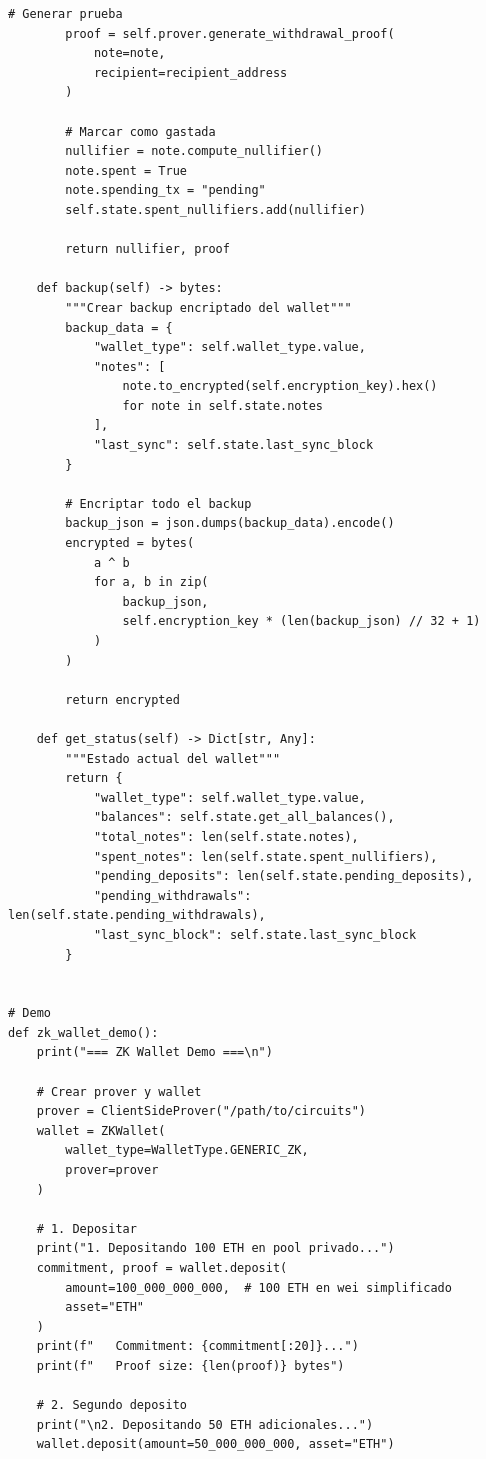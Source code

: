 \documentclass[11pt,a4paper,twoside]{book}
\theoremstyle{definition}
\theoremstyle{remark}
\begin{document}
\begin{lstlisting}[style=python, caption={Arquitectura de wallet con soporte ZK}]
        # Generar prueba
        proof = self.prover.generate_withdrawal_proof(
            note=note,
            recipient=recipient_address
        )
        
        # Marcar como gastada
        nullifier = note.compute_nullifier()
        note.spent = True
        note.spending_tx = "pending"
        self.state.spent_nullifiers.add(nullifier)
        
        return nullifier, proof
    
    def backup(self) -> bytes:
        """Crear backup encriptado del wallet"""
        backup_data = {
            "wallet_type": self.wallet_type.value,
            "notes": [
                note.to_encrypted(self.encryption_key).hex()
                for note in self.state.notes
            ],
            "last_sync": self.state.last_sync_block
        }
        
        # Encriptar todo el backup
        backup_json = json.dumps(backup_data).encode()
        encrypted = bytes(
            a ^ b 
            for a, b in zip(
                backup_json, 
                self.encryption_key * (len(backup_json) // 32 + 1)
            )
        )
        
        return encrypted
    
    def get_status(self) -> Dict[str, Any]:
        """Estado actual del wallet"""
        return {
            "wallet_type": self.wallet_type.value,
            "balances": self.state.get_all_balances(),
            "total_notes": len(self.state.notes),
            "spent_notes": len(self.state.spent_nullifiers),
            "pending_deposits": len(self.state.pending_deposits),
            "pending_withdrawals": len(self.state.pending_withdrawals),
            "last_sync_block": self.state.last_sync_block
        }


# Demo
def zk_wallet_demo():
    print("=== ZK Wallet Demo ===\n")
    
    # Crear prover y wallet
    prover = ClientSideProver("/path/to/circuits")
    wallet = ZKWallet(
        wallet_type=WalletType.GENERIC_ZK,
        prover=prover
    )
    
    # 1. Depositar
    print("1. Depositando 100 ETH en pool privado...")
    commitment, proof = wallet.deposit(
        amount=100_000_000_000,  # 100 ETH en wei simplificado
        asset="ETH"
    )
    print(f"   Commitment: {commitment[:20]}...")
    print(f"   Proof size: {len(proof)} bytes")
    
    # 2. Segundo deposito
    print("\n2. Depositando 50 ETH adicionales...")
    wallet.deposit(amount=50_000_000_000, asset="ETH")
    

\end{lstlisting}
\end{document}
